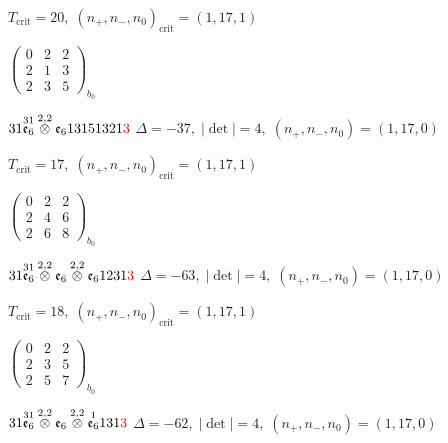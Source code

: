 \documentclass[10pt]{article}
\begin{document}
\hspace{1em}$T_{\text{crit}}=20,\; (n_+,n_-,n_0)_{\text{crit}}=(1,17,1)$

\hspace{2em}$\left(\begin{smallmatrix}0 & 2 & 2 \\ 2 & 1 & 3 \\ 2 & 3 & 5\end{smallmatrix}\right)_{\!b_0}$

\smallskip

$31\overset{31}{\mathfrak{e}_6}\overset{2,2}{\otimes}\mathfrak{e}_613151321\textcolor{red}{3}$ \quad $\Delta=-37,\; |\det|=4,\; (n_+,n_-,n_0)=(1,17,0)$

\hspace{1em}$T_{\text{crit}}=17,\; (n_+,n_-,n_0)_{\text{crit}}=(1,17,1)$

\hspace{2em}$\left(\begin{smallmatrix}0 & 2 & 2 \\ 2 & 4 & 6 \\ 2 & 6 & 8\end{smallmatrix}\right)_{\!b_0}$

\smallskip

$31\overset{31}{\mathfrak{e}_6}\overset{2,2}{\otimes}\mathfrak{e}_6\overset{2,2}{\otimes}\mathfrak{e}_61231\textcolor{red}{3}$ \quad $\Delta=-63,\; |\det|=4,\; (n_+,n_-,n_0)=(1,17,0)$

\hspace{1em}$T_{\text{crit}}=18,\; (n_+,n_-,n_0)_{\text{crit}}=(1,17,1)$

\hspace{2em}$\left(\begin{smallmatrix}0 & 2 & 2 \\ 2 & 3 & 5 \\ 2 & 5 & 7\end{smallmatrix}\right)_{\!b_0}$

\smallskip

$31\overset{31}{\mathfrak{e}_6}\overset{2,2}{\otimes}\mathfrak{e}_6\overset{2,2}{\otimes}\overset{1}{\mathfrak{e}_6}131\textcolor{red}{3}$ \quad $\Delta=-62,\; |\det|=4,\; (n_+,n_-,n_0)=(1,17,0)$
\end{document}
